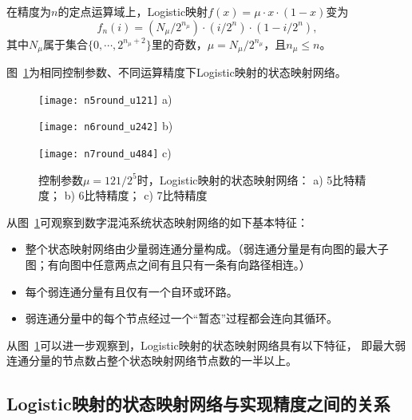 在精度为$n$的定点运算域上，Logistic映射$f(x)=\mu\cdot x\cdot (1-x)$变为
\begin{equation}
f_n(i)=(N_{\mu}/2^{n_\mu})\cdot (i/2^n) \cdot (1-i/2^n),
\label{eq:LogisticFinite}
\end{equation}
其中$N_{\mu}$属于集合$\{0, \cdots, 2^{n_\mu+2}\}$里的奇数，$\mu=N_{\mu}/2^{n_\mu}$，且$n_\mu \le n$。

图~\ref{fig:networkLogistic5and6bits}为相同控制参数、不同运算精度下Logistic映射的状态映射网络。

\begin{figure}[!htb]
\centering
\begin{minipage}{0.8\ThreeImW}
\centering
\texttt{[image: n5round\_u121]}
a)
\end{minipage}\hspace{0.3\figsep}
\begin{minipage}{\ThreeImW}
\centering
\texttt{[image: n6round\_u242]}
b)
\end{minipage}\hspace{0.3\figsep}
\begin{minipage}{1.2\ThreeImW}
\centering
\texttt{[image: n7round\_u484]}
c)
\end{minipage}
\caption{控制参数$\mu=121/2^5$时，Logistic映射的状态映射网络：
a) 5比特精度； b) 6比特精度； c) 7比特精度}
\label{fig:networkLogistic5and6bits}
\end{figure}

\iffalse
通过上述不同定点运算精度下Logistic映射的状态映射网络，可以初步观察到数字混沌系统的状态映射网络具有以下基本特征：\fi
从图~\ref{fig:networkLogistic5and6bits}可观察到数字混沌系统状态映射网络的如下基本特征：
\begin{itemize}
\item 整个状态映射网络由少量弱连通分量构成。（弱连通分量是有向图的最大子图；有向图中任意两点之间有且只有一条有向路径相连。）

\item 每个弱连通分量有且仅有一个自环或环路。

\item 弱连通分量中的每个节点经过一个“暂态”过程都会连向其循环。
\end{itemize}

从图~\ref{fig:networkLogistic5and6bits}可以进一步观察到，Logistic映射的状态映射网络具有以下特征，
即最大弱连通分量的节点数占整个状态映射网络节点数的一半以上。

\subsection{Logistic映射的状态映射网络与实现精度之间的关系}

